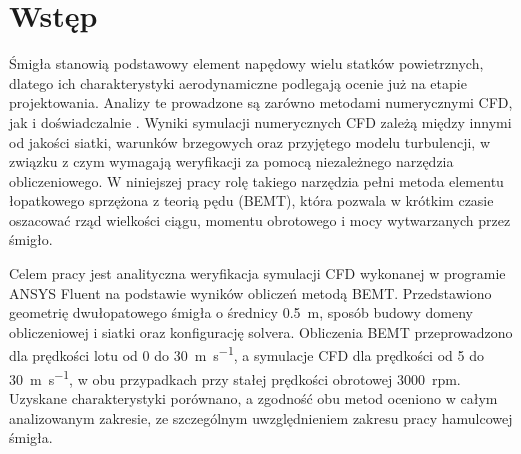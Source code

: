 \documentclass[12pt,a4paper,twoside]{article}
\begin{document}
\clearpage
\tableofcontents
\clearpage
	\section{Wstęp}
	Śmigła stanowią podstawowy element napędowy wielu statków powietrznych, dlatego ich charakterystyki aerodynamiczne podlegają ocenie już na etapie projektowania. Analizy te prowadzone są zarówno metodami numerycznymi CFD, jak i doświadczalnie \cite{hage2024,kutty2017,seeni2019}. Wyniki symulacji numerycznych CFD zależą między innymi od jakości siatki, warunków brzegowych oraz przyjętego modelu turbulencji, w związku z czym wymagają weryfikacji za pomocą niezależnego narzędzia obliczeniowego. W niniejszej pracy rolę takiego narzędzia pełni metoda elementu łopatkowego sprzężona z teorią pędu (BEMT), która pozwala w krótkim czasie oszacować rząd wielkości ciągu, momentu obrotowego i mocy wytwarzanych przez śmigło.
	
	Celem pracy jest analityczna weryfikacja symulacji CFD wykonanej w programie ANSYS Fluent na podstawie wyników obliczeń metodą BEMT. Przedstawiono geometrię dwułopatowego śmigła o średnicy \SI{0.5}{\meter}, sposób budowy domeny obliczeniowej i siatki oraz konfigurację solvera. Obliczenia BEMT przeprowadzono dla prędkości lotu od \num{0} do \SI{30}{\meter\per\second}, a symulacje CFD dla prędkości od 5 do \SI{30}{\meter\per\second}, w obu przypadkach przy stałej prędkości obrotowej \SI{3000}{rpm}. Uzyskane charakterystyki porównano, a zgodność obu metod oceniono w całym analizowanym zakresie, ze szczególnym uwzględnieniem zakresu pracy hamulcowej śmigła.
\end{document}
